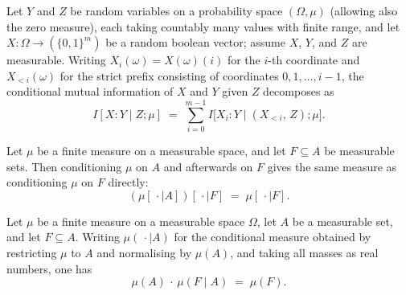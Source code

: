 \begin{theorem}
\label{ProbabilityTheory.condMutualInfo_boolVector_eq_sum_strictPrefix}
\leanok
{}
Let $Y$ and $Z$ be random variables on a probability space $(\Omega, \mu)$ (allowing
also the zero measure), each taking countably many values with finite range, and let $X
: \Omega \to (\{0,1\}^m)$ be a random boolean vector; assume $X$, $Y$, and $Z$ are
measurable. Writing $X_i(\omega) = X(\omega)(i)$ for the $i$-th coordinate and
$X_{<i}(\omega)$ for the strict prefix consisting of coordinates $0, 1, \ldots, i-1$,
the conditional mutual information of $X$ and $Y$ given $Z$ decomposes as
\[
  I[X : Y \mid Z;\mu]
  \;=\; \sum_{i=0}^{m-1}
        I\bigl[X_i : Y \mid (X_{<i},\, Z);\mu\bigr].
\]
\end{theorem}

\begin{theorem}
\label{ProbabilityTheory.cond_cond_eq_cond_of_subset}
\leanok
{}
Let $\mu$ be a finite measure on a measurable space, and let $F \subseteq A$ be
measurable sets. Then conditioning $\mu$ on $A$ and afterwards on $F$ gives the same
measure as conditioning $\mu$ on $F$ directly:
\[
  (\mu[\,\cdot \mid A])[\,\cdot \mid F] \;=\; \mu[\,\cdot \mid F].
\]
\end{theorem}

\begin{theorem}
\label{ProbabilityTheory.measureReal_mul_cond_real_eq_measureReal_of_subset}
\leanok
{}
Let $\mu$ be a finite measure on a measurable space $\Omega$, let $A$ be a measurable
set, and let $F \subseteq A$. Writing $\mu(\,\cdot \mid A)$ for the conditional measure
obtained by restricting $\mu$ to $A$ and normalising by $\mu(A)$, and taking all masses
as real numbers, one has
\[
  \mu(A)\,\cdot\,\mu(F \mid A) \;=\; \mu(F).
\]
\end{theorem}


